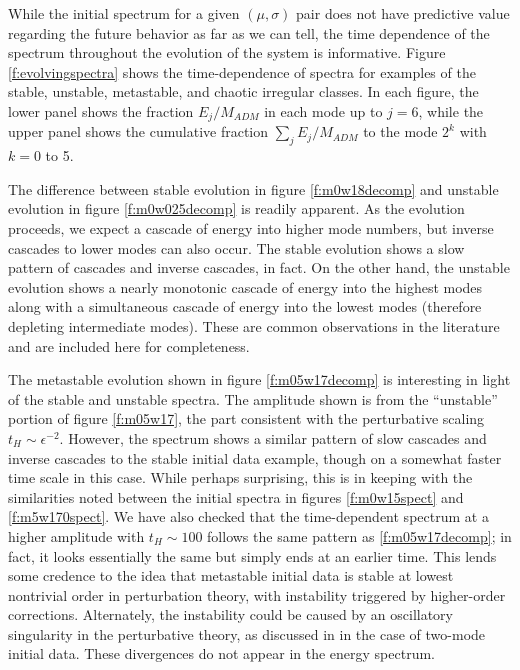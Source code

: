 \documentclass[../PhD.tex]{subfiles}
\begin{document}
While the initial spectrum for a given $(\mu,\sigma)$ pair does not have
predictive value regarding the future behavior as far as
we can tell, the time dependence of the spectrum throughout the evolution of
the system is informative.  Figure \ref{f:evolvingspectra} shows the
time-dependence of spectra for examples of the stable, unstable, metastable,
and chaotic irregular classes. In each figure, the lower panel shows the
fraction $E_j/M_{ADM}$ in each mode up to $j=6$, while the upper panel shows
the cumulative fraction $\sum_j E_j/M_{ADM}$ to the mode $2^k$ with $k=0$ to 5.

The difference between stable evolution in figure \ref{f:m0w18decomp} and
unstable evolution in figure \ref{f:m0w025decomp} is readily apparent.
As the evolution proceeds, we expect a cascade of energy into higher mode
numbers, but inverse cascades to lower modes can also occur.  The stable
evolution shows a slow pattern of cascades and inverse cascades, in fact.
On the other hand, the unstable evolution shows a nearly monotonic cascade of
energy into the highest modes along with a simultaneous cascade of energy
into the lowest modes (therefore depleting intermediate modes).  These
are common observations in the literature and are included here for
completeness.

The metastable evolution shown in figure \ref{f:m05w17decomp} is interesting
in light of the stable and unstable spectra.  The amplitude shown is
from the ``unstable'' portion of figure \ref{f:m05w17}, the part consistent
with the perturbative scaling $t_H\sim\epsilon^{-2}$.  However, the spectrum
shows a similar pattern of slow cascades and inverse cascades to the
stable initial data example, 
though on a somewhat faster time scale in this case.
While perhaps surprising, this is in keeping with the similarities noted
between the initial spectra in figures \ref{f:m0w15spect} and
\ref{f:m5w170spect}.  We have also checked that the time-dependent spectrum
at a higher amplitude with $t_H\sim 100$ follows the same pattern as
\ref{f:m05w17decomp}; in fact, it looks essentially the same but simply
ends at an earlier time.
This lends some credence to the idea that metastable initial data
is stable at lowest nontrivial order in perturbation theory, with
instability triggered by higher-order corrections.  Alternately, the
instability could be caused by an oscillatory singularity in the perturbative
theory, as discussed in \cite{1506.03519,1508.04943,1606.02712,1607.08094}
in the case of two-mode initial data.  These divergences do not appear in
the energy spectrum.
\end{document}
